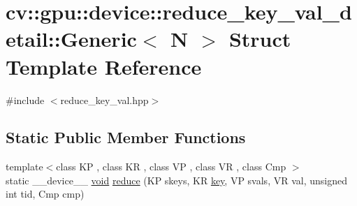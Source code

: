 \hypertarget{structcv_1_1gpu_1_1device_1_1reduce__key__val__detail_1_1Generic}{\section{cv\-:\-:gpu\-:\-:device\-:\-:reduce\-\_\-key\-\_\-val\-\_\-detail\-:\-:Generic$<$ N $>$ Struct Template Reference}
\label{structcv_1_1gpu_1_1device_1_1reduce__key__val__detail_1_1Generic}
}


{\ttfamily \#include $<$reduce\-\_\-key\-\_\-val.\-hpp$>$}

\subsection*{Static Public Member Functions}
\begin{DoxyCompactItemize}
\item 
{\footnotesize template$<$class K\-P , class K\-R , class V\-P , class V\-R , class Cmp $>$ }\\static \-\_\-\-\_\-device\-\_\-\-\_\- \hyperlink{legacy_8hpp_a8bb47f092d473522721002c86c13b94e}{void} \hyperlink{structcv_1_1gpu_1_1device_1_1reduce__key__val__detail_1_1Generic_a42b61a9383769500d3570134a788f281}{reduce} (K\-P skeys, K\-R \hyperlink{core__c_8h_a68cf695b604d08c0b6f6f6bb282a6586}{key}, V\-P svals, V\-R val, unsigned int tid, Cmp cmp)
\end{DoxyCompactItemize}


